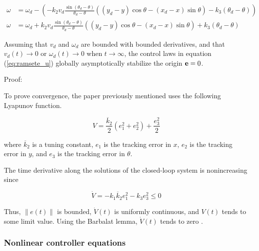 \begin{align*}
  \omega &= \omega_d -
    \left(-k_2 v_d \frac{\sin(\theta_d - \theta)}{\theta_d - \theta}
    ((y_d - y) \cos\theta - (x_d - x) \sin\theta) -
      k_3 (\theta_d - \theta)\right) \\
  \omega &= \omega_d + k_2 v_d \frac{\sin(\theta_d - \theta)}{\theta_d - \theta}
    ((y_d - y) \cos\theta - (x_d - x) \sin\theta) + k_3 (\theta_d - \theta)
\end{align*}

\begin{theorem}
  Assuming that $v_d$ and $\omega_d$ are bounded with bounded derivatives, and
  that $v_d(t) \rightarrow 0$ or $\omega_d(t) \rightarrow 0$ when
  $t \rightarrow \infty$, the control laws in equation (\ref{eq:ramsete_u})
  globally asymptotically stabilize the origin $\mathbf{e} = 0$.

  Proof:

  To prove convergence, the paper previously mentioned uses the following
  Lyapunov function.

  \begin{equation*}
    V = \frac{\overline{k}_2}{2}(e_1^2 + e_2^2) + \frac{e_3^2}{2}
  \end{equation*}

  where $\overline{k}_2$ is a tuning constant, $e_1$ is the tracking error in
  $x$, $e_2$ is the tracking error in $y$, and $e_3$ is the tracking error in
  $\theta$.

  The time derivative along the solutions of the closed-loop \gls{system} is
  nonincreasing since

  \begin{equation*}
    \dot{V} = -k_1 \overline{k}_2 e_1^2 - k_3 e_3^2 \leq 0
  \end{equation*}

  Thus, $\lVert e(t) \rVert$ is bounded, $\dot{V}(t)$ is uniformly continuous,
  and $V(t)$ tends to some limit value. Using the Barbalat lemma, $\dot{V}(t)$
  tends to zero \cite{bib:ctrl_wheeled_mobile_robots}.
\end{theorem}

\subsubsection{Nonlinear controller equations}

